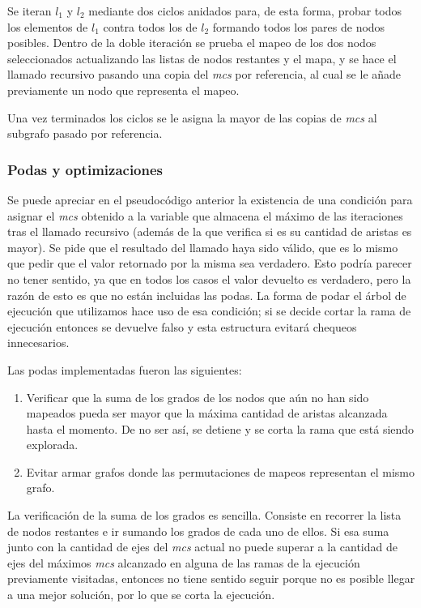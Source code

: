 Se iteran $l_1$ y $l_2$
mediante dos ciclos anidados para, de esta forma, probar todos los elementos de
$l_1$ contra todos los de $l_2$ formando todos los pares de nodos posibles.
Dentro de la doble iteración se prueba el mapeo de los dos nodos seleccionados
actualizando las listas de nodos restantes y el mapa, y se hace el llamado
recursivo pasando una copia del \textit{mcs} por referencia, al cual se le
añade previamente un nodo que representa el mapeo.

Una vez terminados los ciclos se le asigna la mayor de las copias de
\textit{mcs} al subgrafo pasado por referencia.

\subsubsection{Podas y optimizaciones}

Se puede apreciar en el pseudocódigo anterior la existencia de una condición
para asignar el \textit{mcs} obtenido a la variable que almacena el máximo de
las iteraciones tras el llamado recursivo (además de la que verifica si es
su cantidad de aristas es mayor). Se pide que el resultado del llamado haya sido
válido, que es lo mismo que pedir que el valor retornado por la misma sea
verdadero. Esto podría parecer no tener sentido, ya que en todos los casos el valor
devuelto es verdadero, pero la razón de esto es que no están incluidas las podas. La
forma de podar el árbol de ejecución que utilizamos hace uso de esa condición;
si se decide cortar la rama de ejecución entonces se devuelve falso y esta
estructura evitará chequeos innecesarios.

Las podas implementadas fueron las siguientes:

\begin{enumerate}
\item Verificar que la suma de los grados de los nodos que aún no han sido
mapeados pueda ser mayor que la máxima cantidad de aristas alcanzada hasta
el momento. De no ser así, se detiene y se corta la rama que está siendo
explorada.
\item Evitar armar grafos donde las permutaciones de mapeos representan el
mismo grafo.
\end{enumerate}

La verificación de la suma de los grados es sencilla. Consiste en recorrer la
lista de nodos restantes e ir sumando los grados de cada uno de ellos. Si esa
suma junto con la cantidad de ejes del \textit{mcs} actual no puede superar
a la cantidad de ejes del máximos \textit{mcs} alcanzado en alguna de las
ramas de la ejecución previamente visitadas, entonces no tiene sentido seguir
porque no es posible llegar a una mejor solución, por lo que se corta la
ejecución.

